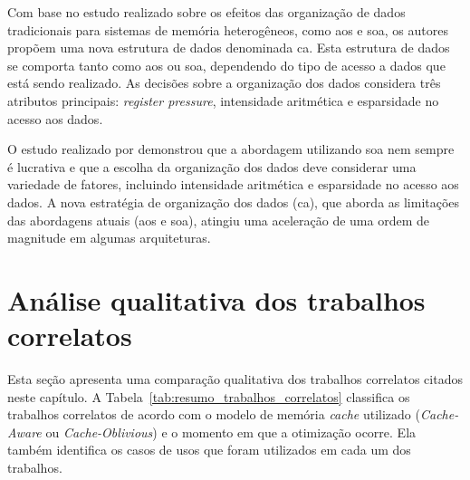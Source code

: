 Com base no estudo realizado sobre os efeitos das organização de dados tradicionais para sistemas de memória heterogêneos, como \ac{aos} e \ac{soa}, os autores propõem uma nova estrutura de dados denominada \ac{ca}.
Esta estrutura de dados se comporta tanto como \ac{aos} ou \ac{soa}, dependendo do tipo de acesso a dados que está sendo realizado.
As decisões sobre a organização dos dados considera três atributos principais: \textit{register pressure}, intensidade aritmética e esparsidade no acesso aos dados.

O estudo realizado por  demonstrou que a abordagem utilizando \ac{soa} nem sempre é lucrativa e que a escolha da organização dos dados deve considerar uma variedade de fatores, incluindo intensidade aritmética e esparsidade no acesso aos dados.
A nova estratégia de organização dos dados (\ac{ca}), que aborda as limitações das abordagens atuais (\ac{aos} e \ac{soa}), atingiu uma aceleração de uma ordem de magnitude em algumas arquiteturas.

\section{Análise qualitativa dos trabalhos correlatos}
\label{sec:analise_trabalhos_correlatos}

Esta seção apresenta uma comparação qualitativa dos trabalhos correlatos citados neste capítulo.
A Tabela~\ref{tab:resumo_trabalhos_correlatos} classifica os trabalhos correlatos de acordo com o modelo de memória \textit{cache} utilizado (\textit{Cache-Aware} ou \textit{Cache-Oblivious}) e o momento em que a otimização ocorre.
Ela também identifica os casos de usos que foram utilizados em cada um dos trabalhos.



